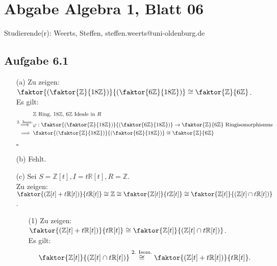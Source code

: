 \documentclass[12pt]{article}
\newcommand{\QED}{\begin{flushright} $\square$ \end{flushright}}
\newcommand{\df}{\enspace\Longrightarrow\enspace}
\begin{document}
\section*{Abgabe Algebra 1, Blatt 06}

Studierende(r): Weerts, Steffen, steffen.weerts@uni-oldenburg.de

\subsection*{Aufgabe 6.1}
\begin{enumerate}
	\item[(a)] Zu zeigen: $\faktor{\left(\faktor{\mathbb{Z}}{18\mathbb{Z}}\right)}{\left(\faktor{6\mathbb{Z}}{18\mathbb{Z}}\right)} \cong \faktor{\mathbb{Z}}{6\mathbb{Z}}$. \\
	Es gilt:
	\begin{align*}
		&\mathbb{Z}\text{ Ring, $18\mathbb{Z}$, $6\mathbb{Z}$ Ideale in $R$} \\
		\overset{\text{2. Isom.}}{\df} &\varphi: \faktor{\left(\faktor{\mathbb{Z}}{18\mathbb{Z}}\right)}{\left(\faktor{6\mathbb{Z}}{18\mathbb{Z}}\right)} \rightarrow \faktor{\mathbb{Z}}{6\mathbb{Z}} \text{ Ringisomorphismus} \\
		\df &\faktor{\left(\faktor{\mathbb{Z}}{18\mathbb{Z}}\right)}{\left(\faktor{6\mathbb{Z}}{18\mathbb{Z}}\right)} \cong \faktor{\mathbb{Z}}{6\mathbb{Z}}
	\end{align*}
	\QED
	
	\item[(b)] Fehlt.
	
	\item[(c)] Sei $S=\mathbb{Z}[t], I=t\mathbb{R}[t], R=\mathbb{Z}$. \\
	Zu zeigen: $\faktor{(\mathbb{Z}[t]+t\mathbb{R}[t])}{t\mathbb{R}[t]} \cong \mathbb{Z} \cong \faktor{\mathbb{Z}[t]}{t\mathbb{Z}[t]} \cong \faktor{\mathbb{Z}[t]}{(\mathbb{Z}[t] \cap t\mathbb{R}[t])}$.
	\begin{enumerate}
		\item[(1)] Zu zeigen: $\faktor{(\mathbb{Z}[t]+t\mathbb{R}[t])}{t\mathbb{R}[t]} \cong \faktor{\mathbb{Z}[t]}{(\mathbb{Z}[t] \cap t\mathbb{R}[t])}$. \\
		Es gilt:
		$$\faktor{\mathbb{Z}[t]}{(\mathbb{Z}[t] \cap t\mathbb{R}[t])} \overset{\text{2. Isom.}}{\cong} \faktor{(\mathbb{Z}[t]+t\mathbb{R}[t])}{t\mathbb{R}[t]}.$$
		

\end{enumerate}
\end{enumerate}
\end{document}
